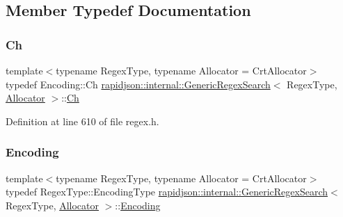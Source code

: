 \subsection{Member Typedef Documentation}
\mbox{\label{classrapidjson_1_1internal_1_1_generic_regex_search_a3d4c81f49677604f40b1c09c4fc0a958}} 
\subsubsection{\texorpdfstring{Ch}{Ch}}
{\footnotesize\ttfamily template$<$typename Regex\+Type, typename Allocator = Crt\+Allocator$>$ \\
typedef Encoding\+::\+Ch \mbox{\hyperlink{classrapidjson_1_1internal_1_1_generic_regex_search}{rapidjson\+::internal\+::\+Generic\+Regex\+Search}}$<$ Regex\+Type, \mbox{\hyperlink{classrapidjson_1_1_allocator}{Allocator}} $>$\+::\mbox{\hyperlink{classrapidjson_1_1internal_1_1_generic_regex_search_a3d4c81f49677604f40b1c09c4fc0a958}{Ch}}}



Definition at line 610 of file regex.\+h.

\mbox{\label{classrapidjson_1_1internal_1_1_generic_regex_search_a826672f13e4f2b5e075cc00e6c871874}} 
\subsubsection{\texorpdfstring{Encoding}{Encoding}}
{\footnotesize\ttfamily template$<$typename Regex\+Type, typename Allocator = Crt\+Allocator$>$ \\
typedef Regex\+Type\+::\+Encoding\+Type \mbox{\hyperlink{classrapidjson_1_1internal_1_1_generic_regex_search}{rapidjson\+::internal\+::\+Generic\+Regex\+Search}}$<$ Regex\+Type, \mbox{\hyperlink{classrapidjson_1_1_allocator}{Allocator}} $>$\+::\mbox{\hyperlink{classrapidjson_1_1internal_1_1_generic_regex_search_a826672f13e4f2b5e075cc00e6c871874}{Encoding}}}



